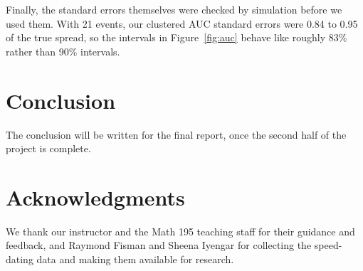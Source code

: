 \documentclass[11pt,letterpaper,reqno]{amsart}
\numberwithin{equation}{subsection}
\theoremstyle{definition}
\numberwithin{thm}{subsection}
\begin{document}
Finally, the standard errors themselves were checked by simulation before we used them. With 21 events, our
clustered AUC standard errors were 0.84 to 0.95 of the true spread, so the intervals in Figure~\ref{fig:auc} behave
like roughly 83\% rather than 90\% intervals.

\section{Conclusion}

The conclusion will be written for the final report, once the second half of the project is complete.

\section{Acknowledgments}

We thank our instructor and the Math 195 teaching staff for their guidance and feedback, and Raymond Fisman and
Sheena Iyengar for collecting the speed-dating data and making them available for research.

\printbibliography

\end{document}
